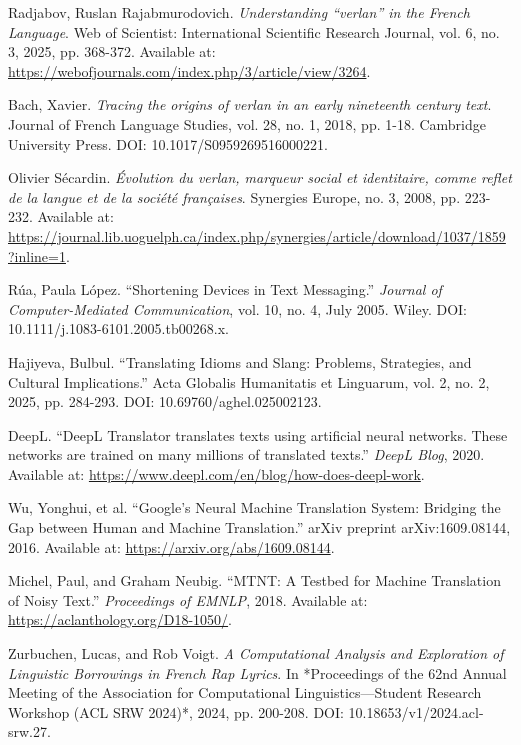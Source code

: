 \documentclass[12pt]{article}
\begin{document}
\cleardoublepage
{}
\begin{thebibliography}{9}

Radjabov, Ruslan Rajabmurodovich. \textit{Understanding ``verlan'' in the French Language}. 
Web of Scientist: International Scientific Research Journal, vol. 6, no. 3, 2025, pp. 368-372. 
Available at: \url{https://webofjournals.com/index.php/3/article/view/3264}.

Bach, Xavier. \textit{Tracing the origins of verlan in an early nineteenth century text}. 
Journal of French Language Studies, vol. 28, no. 1, 2018, pp. 1-18. 
Cambridge University Press. DOI: 10.1017/S0959269516000221.

Olivier Sécardin. \textit{Évolution du verlan, marqueur social et identitaire, comme reflet de la langue et de la société françaises}. 
Synergies Europe, no. 3, 2008, pp. 223-232. 
Available at: \url{https://journal.lib.uoguelph.ca/index.php/synergies/article/download/1037/1859?inline=1}.

Rúa, Paula López. ``Shortening Devices in Text Messaging.'' 
\textit{Journal of Computer-Mediated Communication}, vol. 10, no. 4, July 2005. 
Wiley. DOI: 10.1111/j.1083-6101.2005.tb00268.x.

Hajiyeva, Bulbul. ``Translating Idioms and Slang: Problems, Strategies, and Cultural Implications.''  
Acta Globalis Humanitatis et Linguarum, vol. 2, no. 2, 2025, pp. 284-293. DOI: 10.69760/aghel.025002123.  

DeepL. ``DeepL Translator translates texts using artificial neural networks. These networks are trained on many millions of translated texts.'' 
\textit{DeepL Blog}, 2020. Available at: \url{https://www.deepl.com/en/blog/how-does-deepl-work}.

Wu, Yonghui, et al. ``Google's Neural Machine Translation System: Bridging the Gap between Human and Machine Translation.'' 
arXiv preprint arXiv:1609.08144, 2016. Available at: \url{https://arxiv.org/abs/1609.08144}.

Michel, Paul, and Graham Neubig. ``MTNT: A Testbed for Machine Translation of Noisy Text.''
\textit{Proceedings of EMNLP}, 2018. Available at: \url{https://aclanthology.org/D18-1050/}.

Zurbuchen, Lucas, and Rob Voigt.  
\textit{A Computational Analysis and Exploration of Linguistic Borrowings in French Rap Lyrics}.  
In *Proceedings of the 62nd Annual Meeting of the Association for Computational Linguistics\;---\;Student Research Workshop (ACL SRW 2024)*, 2024, pp. 200-208.  
DOI: 10.18653/v1/2024.acl-srw.27.  


\end{thebibliography}
\end{document}
